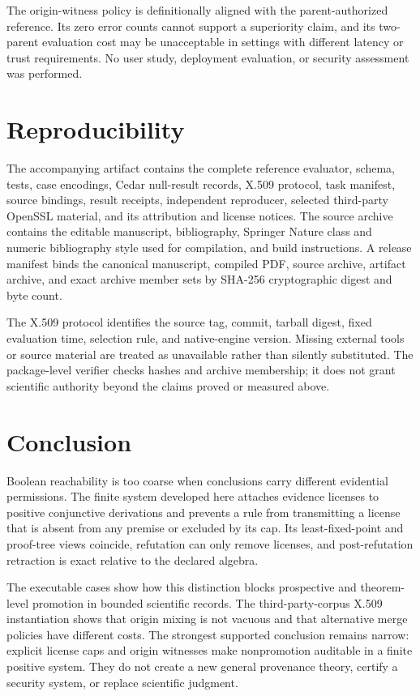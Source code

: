 \documentclass[pdflatex,sn-mathphys-num]{sn-jnl}
\begin{document}
The origin-witness policy is definitionally aligned with the parent-authorized reference. Its zero error counts cannot support a superiority claim, and its two-parent evaluation cost may be unacceptable in settings with different latency or trust requirements. No user study, deployment evaluation, or security assessment was performed.

\section{Reproducibility}\label{reproducibility}

The accompanying artifact contains the complete reference evaluator, schema, tests, case encodings, Cedar null-result records, X.509 protocol, task manifest, source bindings, result receipts, independent reproducer, selected third-party OpenSSL material, and its attribution and license notices. The source archive contains the editable manuscript, bibliography, Springer Nature class and numeric bibliography style used for compilation, and build instructions. A release manifest binds the canonical manuscript, compiled PDF, source archive, artifact archive, and exact archive member sets by SHA-256 cryptographic digest and byte count.

The X.509 protocol identifies the source tag, commit, tarball digest, fixed evaluation time, selection rule, and native-engine version. Missing external tools or source material are treated as unavailable rather than silently substituted. The package-level verifier checks hashes and archive membership; it does not grant scientific authority beyond the claims proved or measured above.

\section{Conclusion}\label{conclusion}

Boolean reachability is too coarse when conclusions carry different evidential permissions. The finite system developed here attaches evidence licenses to positive conjunctive derivations and prevents a rule from transmitting a license that is absent from any premise or excluded by its cap. Its least-fixed-point and proof-tree views coincide, refutation can only remove licenses, and post-refutation retraction is exact relative to the declared algebra.

The executable cases show how this distinction blocks prospective and theorem-level promotion in bounded scientific records. The third-party-corpus X.509 instantiation shows that origin mixing is not vacuous and that alternative merge policies have different costs. The strongest supported conclusion remains narrow: explicit license caps and origin witnesses make nonpromotion auditable in a finite positive system. They do not create a new general provenance theory, certify a security system, or replace scientific judgment.
\end{document}

